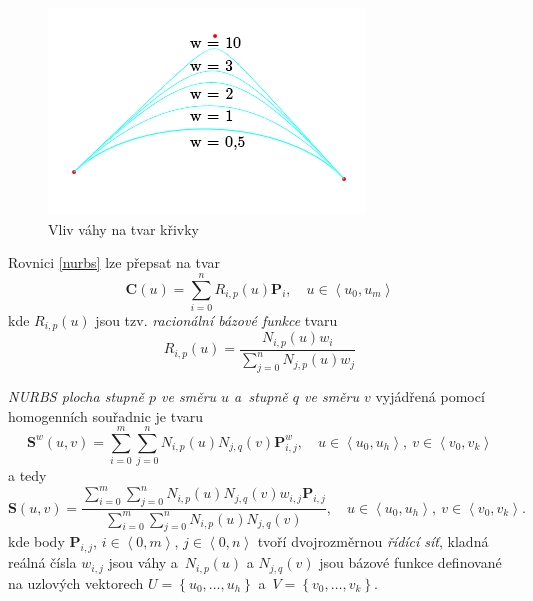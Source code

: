 \begin{figure}[!h]
	\begin{center}
		\includegraphics*[]{obr/vaha}
	\end{center}
	\caption{Vliv váhy na tvar křivky}
	\label{obrVaha}
\end{figure}

\begin{veta}
	Rovnici \eqref{nurbs} lze přepsat na tvar
	\begin{equation}
		\mathbf{C}\left(u\right)=\sum _{i=0}^{n}{R}_{i,p}\left(u\right)\mathbf{P}_i,\quad u \in \left\langle u_0,u_m \right\rangle
	\end{equation}
	kde ${R}_{i,p}\left( u \right)$ jsou tzv. \emph{racionální bázové funkce} tvaru
	\begin{equation}\label{rational-basis}
		{R}_{i,p}\left(u\right)=\frac{{N}_{i,p}\left(u\right)w_i}{\sum _{j=0}^{n}{N}_{j,p}\left(u\right)w_j}
	\end{equation}
\end{veta}

\begin{definice}
	\emph{NURBS plocha stupně $p$ ve směru $u$ a~stupně $q$ ve směru $v$} vyjádřená pomocí homogenních souřadnic je tvaru
	\begin{equation}\label{nurbs-surface-homo}
		\mathbf{S}^w\left(u,v\right)=\sum _{i=0}^{m}\sum _{j=0}^{n}{N}_{i,p}\left(u\right){N}_{j,q}\left(v\right)\mathbf{P}^w_{i,j}, \quad u \in \left\langle u_0,u_h \right\rangle,\ v \in \left\langle v_0,v_k \right\rangle
	\end{equation}
	a tedy
	\begin{equation}\label{nurbs-surface}
		\mathbf{S}\left(u,v\right)=\frac{\sum _{i=0}^{m}\sum _{j=0}^{n}{N}_{i,p}\left(u\right){N}_{j,q}\left(v\right)w_{i,j}\mathbf{P}_{i,j}}{\sum _{i=0}^{m}\sum _{j=0}^{n}{N}_{i,p}\left(u\right){N}_{j,q}\left(v\right)}, \quad u \in \left\langle u_0,u_h \right\rangle,\ v \in \left\langle v_0,v_k \right\rangle.
	\end{equation}
	kde body $\mathbf{P}_{i,j}$, $i\in\left\langle0,m\right\rangle$, $j\in\left\langle 0,n\right\rangle$ tvoří dvojrozměrnou \emph{řídící síť}, kladná reálná čísla $w_{i,j}$ jsou váhy a~$N_{i,p}\left(u\right)$
	a $N_{j,q}\left(v\right)$ jsou bázové funkce definované na uzlových vektorech $U=\left\lbrace u_0,\dots,u_h \right\rbrace $ a~$V=\left\lbrace v_0,\dots,v_k \right\rbrace $.
\end{definice}

